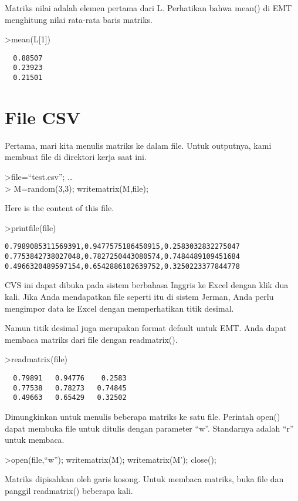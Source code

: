 \documentclass[
]{book}
\begin{document}
Matriks nilai adalah elemen pertama dari L. Perhatikan bahwa mean() di EMT menghitung nilai rata-rata baris matriks.

\textgreater mean(L{[}1{]})

\begin{verbatim}
  0.88507 
  0.23923 
  0.21501 
\end{verbatim}

\chapter{File CSV}\label{file-csv}

Pertama, mari kita menulis matriks ke dalam file. Untuk outputnya, kami membuat file di direktori kerja saat ini.

\textgreater file=``test.csv''; \ldots{}\\
\textgreater{} M=random(3,3); writematrix(M,file);

Here is the content of this file.

\textgreater printfile(file)

\begin{verbatim}
0.7989085311569391,0.9477575186450915,0.2583032832275047
0.7753842738027048,0.7827250443080574,0.7484489109451684
0.4966320489597154,0.6542886102639752,0.3250223377844778
\end{verbatim}

CVS ini dapat dibuka pada sistem berbahasa Inggris ke Excel dengan klik dua kali. Jika Anda mendapatkan file seperti itu di sistem Jerman, Anda perlu mengimpor data ke Excel dengan memperhatikan titik desimal.

Namun titik desimal juga merupakan format default untuk EMT. Anda dapat membaca matriks dari file dengan readmatrix().

\textgreater readmatrix(file)

\begin{verbatim}
  0.79891   0.94776    0.2583 
  0.77538   0.78273   0.74845 
  0.49663   0.65429   0.32502 
\end{verbatim}

Dimungkinkan untuk menulis beberapa matriks ke satu file. Perintah open() dapat membuka file untuk ditulis dengan parameter ``w''. Standarnya adalah ``r'' untuk membaca.

\textgreater open(file,``w''); writematrix(M); writematrix(M'); close();

Matriks dipisahkan oleh garis kosong. Untuk membaca matriks, buka file dan panggil readmatrix() beberapa kali.
\end{document}
